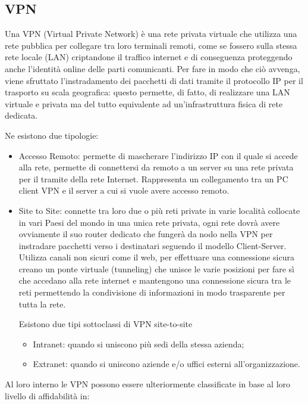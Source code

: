 \subsection{VPN}
Una VPN (Virtual Private Network) è una rete privata virtuale che utilizza una rete pubblica per collegare tra loro terminali remoti, come se fossero sulla stessa rete locale (LAN) criptandone il traffico internet e di conseguenza proteggendo anche l’identità online delle parti comunicanti. Per fare in modo che ciò avvenga, viene sfruttato l’instradamento dei pacchetti di dati tramite il protocollo IP per il trasporto su scala geografica: questo permette, di fatto, di realizzare una LAN virtuale e privata ma del tutto equivalente ad un’infrastruttura fisica di rete dedicata.

Ne esistono due tipologie:

\begin{itemize}
    \item Accesso Remoto: permette di mascherare l’indirizzo IP con il quale si accede alla rete, permette di connettersi da remoto a un server su una rete privata per il tramite della rete Internet. Rappresenta un collegamento tra un PC client VPN e il server a cui si vuole avere accesso remoto.
    \item Site to Site: connette tra loro due o più reti private in varie località collocate in vari Paesi del mondo in una unica rete privata, ogni rete dovrà avere ovviamente il suo router dedicato che fungerà da nodo nella VPN per instradare pacchetti verso i destinatari seguendo il modello Client-Server. Utilizza canali non sicuri come il web, per effettuare una connessione sicura creano un ponte virtuale (tunneling) che unisce le varie posizioni per fare sì che accedano alla rete internet e mantengono una connessione sicura tra le reti permettendo la condivisione di informazioni in modo trasparente per tutta la rete.
    
    Esistono due tipi sottoclassi di VPN site-to-site

    \begin{itemize}
            \item Intranet: quando si uniscono più sedi della stessa azienda; 
            \item Extranet: quando si uniscono aziende e/o uffici esterni all’organizzazione.
    \end{itemize}
\end{itemize}

Al loro interno le VPN possono essere ulteriormente classificate in base al loro livello di affidabilità in:

